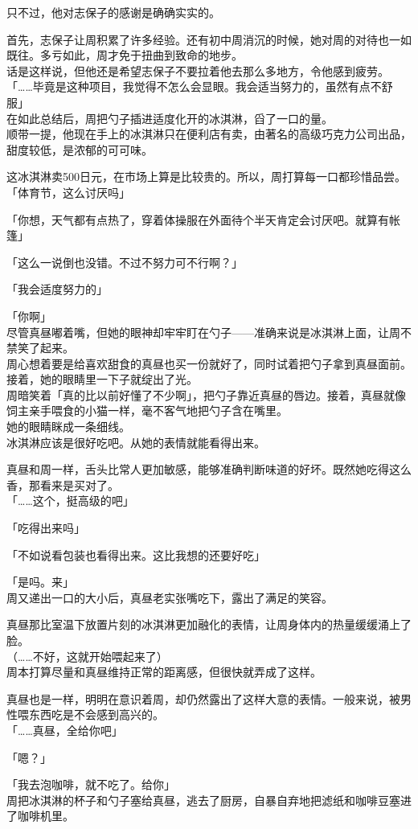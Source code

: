 只不过，他对志保子的感谢是确确实实的。

首先，志保子让周积累了许多经验。还有初中周消沉的时候，她对周的对待也一如既往。多亏如此，周才免于扭曲到致命的地步。\\

话是这样说，但他还是希望志保子不要拉着他去那么多地方，令他感到疲劳。\\

「……毕竟是这种项目，我觉得不怎么会显眼。我会适当努力的，虽然有点不舒服」\\

在如此总结后，周把勺子插进适度化开的冰淇淋，舀了一口的量。\\

顺带一提，他现在手上的冰淇淋只在便利店有卖，由著名的高级巧克力公司出品，甜度较低，是浓郁的可可味。

这冰淇淋卖500日元，在市场上算是比较贵的。所以，周打算每一口都珍惜品尝。\\

「体育节，这么讨厌吗」

「你想，天气都有点热了，穿着体操服在外面待个半天肯定会讨厌吧。就算有帐篷」

「这么一说倒也没错。不过不努力可不行啊？」

「我会适度努力的」

「你啊」\\

尽管真昼嘟着嘴，但她的眼神却牢牢盯在勺子——准确来说是冰淇淋上面，让周不禁笑了起来。\\

周心想着要是给喜欢甜食的真昼也买一份就好了，同时试着把勺子拿到真昼面前。接着，她的眼睛里一下子就绽出了光。\\

周暗笑着「真的比以前好懂了不少啊」，把勺子靠近真昼的唇边。接着，真昼就像饲主亲手喂食的小猫一样，毫不客气地把勺子含在嘴里。\\

她的眼睛眯成一条细线。\\

冰淇淋应该是很好吃吧。从她的表情就能看得出来。

真昼和周一样，舌头比常人更加敏感，能够准确判断味道的好坏。既然她吃得这么香，那看来是买对了。\\

「……这个，挺高级的吧」

「吃得出来吗」

「不如说看包装也看得出来。这比我想的还要好吃」

「是吗。来」\\

周又递出一口的大小后，真昼老实张嘴吃下，露出了满足的笑容。

真昼那比室温下放置片刻的冰淇淋更加融化的表情，让周身体内的热量缓缓涌上了脸。\\

（……不好，这就开始喂起来了）\\

周本打算尽量和真昼维持正常的距离感，但很快就弄成了这样。

真昼也是一样，明明在意识着周，却仍然露出了这样大意的表情。一般来说，被男性喂东西吃是不会感到高兴的。\\

「……真昼，全给你吧」

「嗯？」

「我去泡咖啡，就不吃了。给你」\\

周把冰淇淋的杯子和勺子塞给真昼，逃去了厨房，自暴自弃地把滤纸和咖啡豆塞进了咖啡机里。
